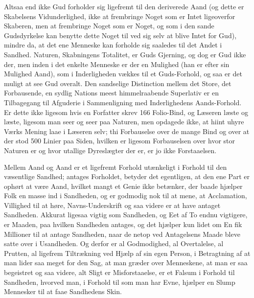 \documentclass[12pt,a4paper]{article}
\begin{document}
Altsaa end ikke Gud forholder sig ligefremt til den deriverede Aand (og dette er Skabelsens Vidunderlighed, ikke at frembringe Noget som er Intet ligeoverfor Skaberen, men at frembringe Noget som er Noget, og som i den sande Gudsdyrkelse kan benytte dette Noget til ved sig selv at blive Intet for Gud), mindre da, at det ene Menneske kan forholde sig saaledes til det Andet i Sandhed. Naturen, Skabningens Totalitet, er Guds Gjerning, og dog er Gud ikke der, men inden i det enkelte Menneske er der en Mulighed (han er efter sin Mulighed Aand), som i Inderligheden vækkes til et Guds-Forhold, og saa er det muligt at see Gud overalt. Den sandselige Distinction mellem det Store, det Forbausende, en sydlig Nations meest himmelraabende Superlativ er en Tilbagegang til Afguderie i Sammenligning med Inderlighedens Aands-Forhold. Er dette ikke ligesom hvis en Forfatter skrev 166 Folio-Bind, og Læseren læste og læste, ligesom man seer og seer paa Naturen, men opdagede ikke, at hiint uhyre Værks Mening laae i Læseren selv; thi Forbauselse over de mange Bind og over at der stod 500 Linier paa Siden, hvilken er ligesom Forbauselsen over hvor stor Naturen er og hvor utallige Dyreslægter der er, er jo ikke Forstaaelsen.

Mellem Aand og Aand er et ligefremt Forhold utænkeligt i Forhold til den væsentlige Sandhed; antages Forholdet, betyder det egentligen, at den ene Part er ophørt at være Aand, hvilket mangt et Genie ikke betænker, der baade hjælper Folk en masse ind i Sandheden, og er godmodig nok til at mene, at Acclamation, Villighed til at høre, Navns-Underskrift og saa videre er at have antaget Sandheden. Akkurat ligesaa vigtig som Sandheden, og Eet af To endnu vigtigere, er Maaden, paa hvilken Sandheden antages, og det hjælper kun lidet om En fik Millioner til at antage Sandheden, naar de netop ved Antagelsens Maade bleve satte over i Usandheden. Og derfor er al Godmodighed, al Overtalelse, al Prutten, al ligefrem Tiltrækning ved Hjælp af sin egen Person, i Betragtning af at man lider saa meget for den Sag, at man græder over Menneskene, at man er saa begeistret og saa videre, alt Sligt er Misforstaaelse, er et Falsum i Forhold til Sandheden, hvorved man, i Forhold til som man har Evne, hjælper en Slump Mennesker til at faae Sandhedens Skin.
\end{document}

